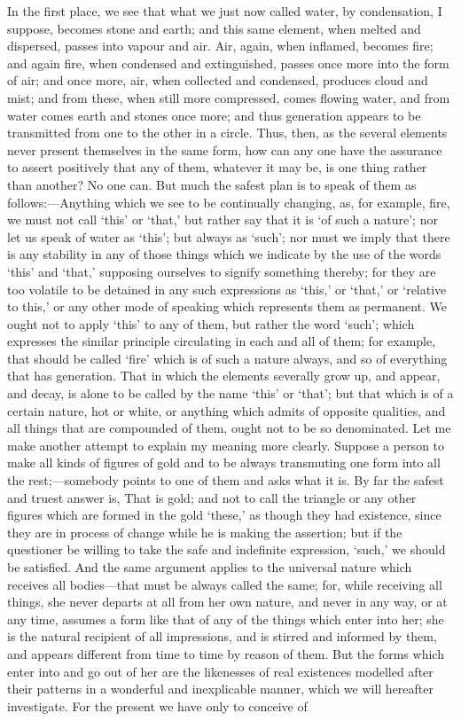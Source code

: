 \documentclass[11pt,letter]{article}
\begin{document}
\par  In the first place, we see that what we just now called water, by condensation, I suppose, becomes stone and earth; and this same element, when melted and dispersed, passes into vapour and air. Air, again, when inflamed, becomes fire; and again fire, when condensed and extinguished, passes once more into the form of air; and once more, air, when collected and condensed, produces cloud and mist; and from these, when still more compressed, comes flowing water, and from water comes earth and stones once more; and thus generation appears to be transmitted from one to the other in a circle. Thus, then, as the several elements never present themselves in the same form, how can any one have the assurance to assert positively that any of them, whatever it may be, is one thing rather than another? No one can. But much the safest plan is to speak of them as follows:—Anything which we see to be continually changing, as, for example, fire, we must not call ‘this’ or ‘that,’ but rather say that it is ‘of such a nature’; nor let us speak of water as ‘this’; but always as ‘such’; nor must we imply that there is any stability in any of those things which we indicate by the use of the words ‘this’ and ‘that,’ supposing ourselves to signify something thereby; for they are too volatile to be detained in any such expressions as ‘this,’ or ‘that,’ or ‘relative to this,’ or any other mode of speaking which represents them as permanent. We ought not to apply ‘this’ to any of them, but rather the word ‘such’; which expresses the similar principle circulating in each and all of them; for example, that should be called ‘fire’ which is of such a nature always, and so of everything that has generation. That in which the elements severally grow up, and appear, and decay, is alone to be called by the name ‘this’ or ‘that’; but that which is of a certain nature, hot or white, or anything which admits of opposite qualities, and all things that are compounded of them, ought not to be so denominated. Let me make another attempt to explain my meaning more clearly. Suppose a person to make all kinds of figures of gold and to be always transmuting one form into all the rest;—somebody points to one of them and asks what it is. By far the safest and truest answer is, That is gold; and not to call the triangle or any other figures which are formed in the gold ‘these,’ as though they had existence, since they are in process of change while he is making the assertion; but if the questioner be willing to take the safe and indefinite expression, ‘such,’ we should be satisfied. And the same argument applies to the universal nature which receives all bodies—that must be always called the same; for, while receiving all things, she never departs at all from her own nature, and never in any way, or at any time, assumes a form like that of any of the things which enter into her; she is the natural recipient of all impressions, and is stirred and informed by them, and appears different from time to time by reason of them. But the forms which enter into and go out of her are the likenesses of real existences modelled after their patterns in a wonderful and inexplicable manner, which we will hereafter investigate. For the present we have only to conceive of 
\end{document}
